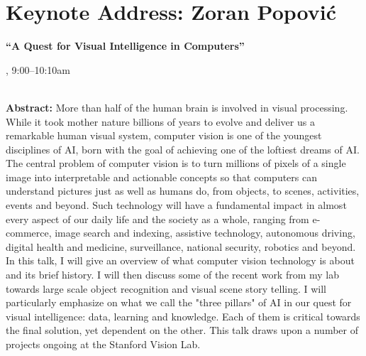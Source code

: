 \section{Keynote Address: Zoran Popović}
\begin{center}

\begin{Large}
{\bfseries\Large ``A Quest for Visual Intelligence in Computers''}
\vspace{1em}\par
\end{Large}

\daydateyear, 9:00--10:10am \vspace{1em}\\
\PlenaryLoc \\
\vspace{1em}\par
\end{center}

\noindent
{\bfseries Abstract:} More than half of the human brain is involved in
visual processing. While it took mother nature billions of years to
evolve and deliver us a remarkable human visual system, computer
vision is one of the youngest disciplines of AI, born with the goal of
achieving one of the loftiest dreams of AI. The central problem of
computer vision is to turn millions of pixels of a single image into
interpretable and actionable concepts so that computers can understand
pictures just as well as humans do, from objects, to scenes,
activities, events and beyond. Such technology will have a fundamental
impact in almost every aspect of our daily life and the society as a
whole, ranging from e-commerce, image search and indexing, assistive
technology, autonomous driving, digital health and medicine,
surveillance, national security, robotics and beyond. In this talk, I
will give an overview of what computer vision technology is about and
its brief history. I will then discuss some of the recent work from my
lab towards large scale object recognition and visual scene story
telling. I will particularly emphasize on what we call the "three
pillars" of AI in our quest for visual intelligence: data, learning
and knowledge. Each of them is critical towards the final solution,
yet dependent on the other. This talk draws upon a number of projects
ongoing at the Stanford Vision Lab. 

\vspace{3em}\par 

